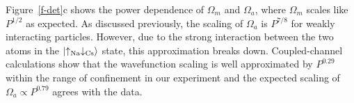 \documentclass[aps,prl,twocolumn,10pt,superscriptaddress]{revtex4-1}
\begin{document}
Figure~\ref{f-det}c shows the power dependence of $ \Omega_m $ and $ \Omega_a $, where $ \Omega_m $ scales like $ P^{1/2} $ as expected. As discussed previously, the scaling of $ \Omega_a $ is $P^{7/8}$ for weakly interacting particles.
However, due to the strong interaction between the two atoms in the $\ket{\uparrow_{\text{Na}}\downarrow_{\text{Cs}}}$ state, this approximation breaks down.
Coupled-channel calculations show that the wavefunction scaling
is well approximated by $P^{0.29}$ within the range of confinement in our experiment and the expected scaling of $ \Omega_a \propto P^{0.79} $ agrees with the data.




\end{document}
